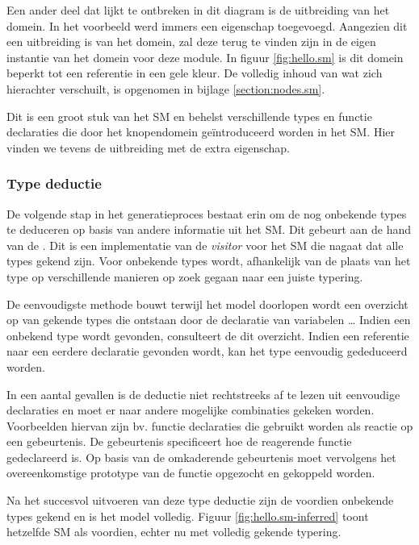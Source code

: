 Een ander deel dat lijkt te ontbreken in dit diagram is de uitbreiding van het
domein. In het voorbeeld werd immers een eigenschap  toegevoegd.
Aangezien dit een uitbreiding is van het domein, zal deze terug te vinden zijn
in de eigen instantie van het domein voor deze module. In figuur
\ref{fig:hello.sm} is dit domein beperkt tot een referentie in een gele kleur.
De volledig inhoud van wat zich hierachter verschuilt, is opgenomen in bijlage
\ref{section:nodes.sm}.

Dit is een groot stuk van het SM en behelst verschillende types en functie
declaraties die door het knopendomein ge\"introduceerd worden in het SM. Hier
vinden we tevens de uitbreiding met de extra  eigenschap.

\subsubsection{Type deductie}

De volgende stap in het generatieproces bestaat erin om de nog onbekende types
te deduceren op basis van andere informatie uit het SM. Dit gebeurt aan de hand
van de . Dit is een implementatie van de \emph{visitor}
voor het SM die nagaat dat alle types gekend zijn. Voor onbekende types wordt,
afhankelijk van de plaats van het type op verschillende manieren op zoek gegaan
naar een juiste typering.

De eenvoudigste methode bouwt terwijl het model doorlopen wordt een overzicht
op van gekende types die ontstaan door de declaratie van variabelen \dots
Indien een onbekend type wordt gevonden, consulteert de 
dit overzicht. Indien een referentie naar een eerdere declaratie gevonden
wordt, kan het type eenvoudig gededuceerd worden.

In een aantal gevallen is de deductie niet rechtstreeks af te lezen uit
eenvoudige declaraties en moet er naar andere mogelijke combinaties gekeken
worden. Voorbeelden hiervan zijn bv. functie declaraties die gebruikt worden
als reactie op een gebeurtenis. De gebeurtenis specificeert hoe de reagerende
functie gedeclareerd is. Op basis van de omkaderende gebeurtenis moet
vervolgens het overeenkomstige prototype van de functie opgezocht en gekoppeld
worden.

Na het succesvol uitvoeren van deze type deductie zijn de voordien onbekende
types gekend en is het model volledig. Figuur \ref{fig:hello.sm-inferred} toont
hetzelfde SM als voordien, echter nu met volledig gekende typering.

